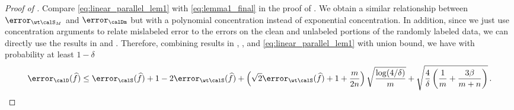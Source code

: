 \begin{proof}[Proof of ]
    Compare \eqref{eq:linear_parallel_lem1} with \eqref{eq:lemma1_final} 
    in the proof of . 
    We obtain a similar relationship 
    between $\error_{\wt \calS_M }$ and $\error_{\calDm}$ 
    but with a polynomial concentration 
    instead of exponential concentration. 
    In addition, since we just use concentration arguments 
    to relate mislabeled error to the errors
    on the clean and unlabeled portions 
    of the randomly labeled data, 
    we can directly use the results 
    in  and . 
    Therefore, combining results in , , and \eqref{eq:linear_parallel_lem1} with union bound, 
    we have with probability at least $1-\delta$
    \begin{align}
        \error_\calD(\widehat f) \le \error_\calS(\widehat f) + 1 - 2 \error_{\wt\calS}(\widehat f) + \left(\sqrt{2}\error_{\wt\calS}(\widehat f) + 1 + \frac{m}{2n} \right) \sqrt{\frac{\log(4/\delta)}{m}} + \sqrt{\frac{4}{\delta}\left(\frac{1}{m} +\frac{3\beta}{m+n} \right)}  \,.
    \end{align}
    

       
\end{proof}

